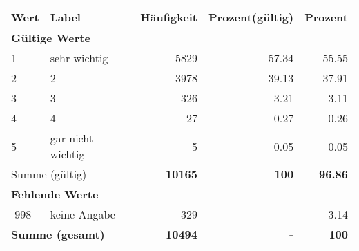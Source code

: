      \begin{longtable}{lXrrr}
     \toprule
     \textbf{Wert} & \textbf{Label} & \textbf{Häufigkeit} & \textbf{Prozent(gültig)} & \textbf{Prozent} \\
     \endhead
     \midrule
     \multicolumn{5}{l}{\textbf{Gültige Werte}}\\

     1 &
     \multicolumn{1}{X}{ sehr wichtig   } &


       \num{5829} &
       \num[round-mode=places,round-precision=2]{57.34} &
         \num[round-mode=places,round-precision=2]{55.55} \\

     2 &
     \multicolumn{1}{X}{ 2   } &


       \num{3978} &
       \num[round-mode=places,round-precision=2]{39.13} &
         \num[round-mode=places,round-precision=2]{37.91} \\

     3 &
     \multicolumn{1}{X}{ 3   } &


       \num{326} &
       \num[round-mode=places,round-precision=2]{3.21} &
         \num[round-mode=places,round-precision=2]{3.11} \\

     4 &
     \multicolumn{1}{X}{ 4   } &


       \num{27} &
       \num[round-mode=places,round-precision=2]{0.27} &
         \num[round-mode=places,round-precision=2]{0.26} \\

     5 &
     \multicolumn{1}{X}{ gar nicht wichtig   } &


       \num{5} &
       \num[round-mode=places,round-precision=2]{0.05} &
         \num[round-mode=places,round-precision=2]{0.05} \\
     \midrule
     \multicolumn{2}{l}{Summe (gültig)} &
       \textbf{\num{10165}} &
     \textbf{\num{100}} &
       \textbf{\num[round-mode=places,round-precision=2]{96.86}} \\
     \multicolumn{5}{l}{\textbf{Fehlende Werte}}\\
       -998 &
       keine Angabe &
         \num{329} &
        - &
         \num[round-mode=places,round-precision=2]{3.14} \\
     \midrule
     \multicolumn{2}{l}{\textbf{Summe (gesamt)}} &
          \textbf{\num{10494}} &
        \textbf{-} &
        \textbf{\num{100}} \\
     \bottomrule
     \end{longtable}
     
